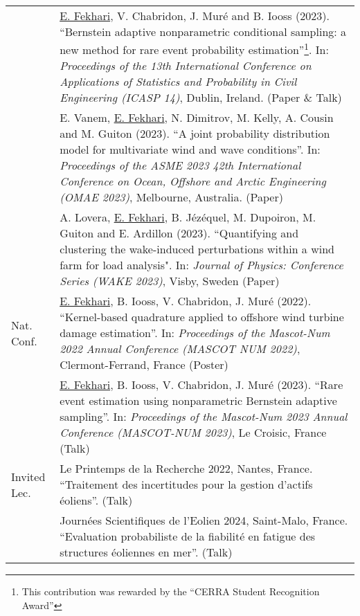 \begin{center}
\begin{tabularx}{\textwidth}{l X}
                    & \underline{E. Fekhari}, V. Chabridon, J. Muré and B. Iooss (2023). 
                    ``Bernstein adaptive nonparametric conditional sampling: a new method for rare event probability estimation''\footnote{This contribution was rewarded by the ``CERRA Student Recognition Award''}.
                    In: \textit{Proceedings of the 13th International Conference on Applications of Statistics and Probability in Civil Engineering (ICASP 14)}, Dublin, Ireland. (Paper \& Talk)\\
        
                    & E. Vanem, \underline{E. Fekhari}, N. Dimitrov, M. Kelly, A. Cousin and M. Guiton (2023). 
                    ``A joint probability distribution model for multivariate wind and wave conditions''.
                    In: \textit{Proceedings of the ASME 2023 42th International Conference on Ocean, Offshore and Arctic Engineering (OMAE 2023)}, Melbourne, Australia. (Paper)\\
        
                    & A. Lovera, \underline{E. Fekhari}, B. Jézéquel, M. Dupoiron, M. Guiton and E. Ardillon (2023). 
                    ``Quantifying and clustering the wake-induced perturbations within a wind farm for load analysis". 
                    In: \textit{Journal of Physics: Conference Series (WAKE 2023)}, Visby, Sweden (Paper)\\
        \hline
        Nat. Conf.  & \underline{E. Fekhari}, B. Iooss, V. Chabridon, J. Muré (2022).
                    ``Kernel-based quadrature applied to offshore wind turbine damage estimation''. 
                    In: \textit{Proceedings of the Mascot-Num 2022 Annual Conference (MASCOT NUM 2022)}, Clermont-Ferrand, France (Poster)\\
        
                    & \underline{E. Fekhari}, B. Iooss, V. Chabridon, J. Muré (2023).
                    ``Rare event estimation using nonparametric Bernstein adaptive sampling''. 
                    In: \textit{Proceedings of the Mascot-Num 2023 Annual Conference (MASCOT-NUM 2023)}, Le Croisic, France (Talk)\\
        \hline
        Invited Lec.& Le Printemps de la Recherche 2022, Nantes, France. ``Traitement des incertitudes pour la gestion d’actifs éoliens''. (Talk)\\

                    & Journées Scientifiques de l’Eolien 2024, Saint-Malo, France. ``Evaluation probabiliste de la fiabilité en fatigue des structures éoliennes en mer''. (Talk)
                    
        \end{tabularx}    
\end{center}

